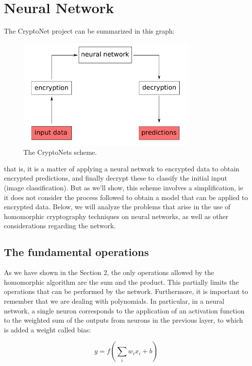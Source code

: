 \section{Neural Network}

The CryptoNet project can be summarized in this graph:

\begin{figure}[H]
	\centering
	\includegraphics[width=0.8\textwidth]{images/fig2.pdf}
    \caption{The CryptoNets scheme.}
    \label{fig:im2}
\end{figure}

\noindent that is, it is a matter of applying a neural network to encrypted data to obtain encrypted predictions, and finally decrypt these to classify the initial input (image classification). But as we'll show, this scheme involves a simplification, ie it does not consider the process followed to obtain a model that can be applied to encrypted data. Below, we will analyze the problems that arise in the use of homomorphic cryptography techniques on neural networks, as well as other considerations regarding the network.

\subsection{The fundamental operations}

As we have shown in the Section 2, the only operations allowed by the homomorphic algorithm are the sum and the product. This partially limits the operations that can be performed by the network. Furthermore, it is important to remember that we are dealing with polynomials. In particular, in a neural network, a single neuron corresponds to the application of an activation function to the weighted sum of the outputs from neurons in the previous layer, to which is added a weight called bias:

\begin{equation*}
    y = f\left(\sum\limits_i w_i x_i + b\right)
\end{equation*}

